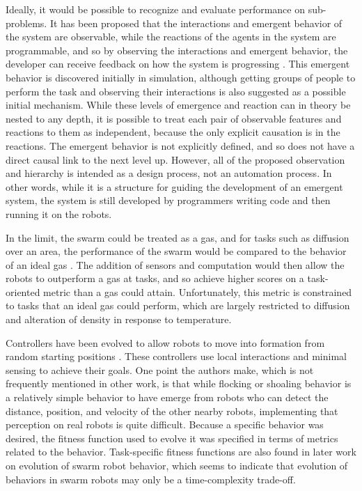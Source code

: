 \documentclass[]{article}
\begin{document}
Ideally, it would be possible to recognize and evaluate performance on sub-problems. 
It has been proposed that the interactions and emergent behavior of the system are observable, while the reactions of the agents in the system are programmable, and so by observing the interactions and emergent behavior, the developer can receive feedback on how the system is progressing \cite{palmer2005behavioral}. 
This emergent behavior is discovered initially in simulation, although getting groups of people to perform the task and observing their interactions is also suggested as a possible initial mechanism.
While these levels of emergence and reaction can in theory be nested to any depth, it is possible to treat each pair of observable features and reactions to them as independent, because the only explicit causation is in the reactions. 
The emergent behavior is not explicitly defined, and so does not have a direct causal link to the next level up. 
However, all of the proposed observation and hierarchy is intended as a design process, not an automation process. 
In other words, while it is a structure for guiding the development of an emergent system, the system is still developed by programmers writing code and then running it on the robots.

In the limit, the swarm could be treated as a gas, and for tasks such as diffusion over an area, the performance of the swarm would be compared to the behavior of an ideal gas \cite{jantz1997kinetics}.
The addition of sensors and computation would then allow the robots to outperform a gas at tasks, and so achieve higher scores on a task-oriented metric than a gas could attain. 
Unfortunately, this metric is constrained to tasks that an ideal gas could perform, which are largely restricted to diffusion and alteration of density in response to temperature. 

Controllers have been evolved to allow robots to move into formation from random starting positions \cite{quinn2003evolving}. 
These controllers use local interactions and minimal sensing to achieve their goals. 
One point the authors make, which is not frequently mentioned in other work, is that while flocking or shoaling behavior is a relatively simple behavior to have emerge from robots who can detect the distance, position, and velocity of the other nearby robots, implementing that perception on real robots is quite difficult.
Because a specific behavior was desired, the fitness function used to evolve it was specified in terms of metrics related to the behavior. 
Task-specific fitness functions are also found in later work on evolution of swarm robot behavior, which seems to indicate that evolution of behaviors in swarm robots may only be a time-complexity trade-off. 
\end{document}
